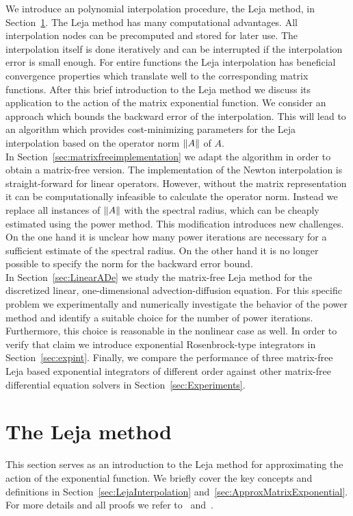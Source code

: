 \documentclass{scrartcl}
\begin{document}
	We introduce an polynomial interpolation procedure, the Leja method, in Section~\ref{sec:LejaMethod}. The Leja method has many computational advantages. All interpolation nodes can be precomputed and stored for later use. The interpolation itself is done iteratively and can be interrupted if the interpolation error is small enough. For entire functions the Leja interpolation has beneficial convergence properties which translate well to the corresponding matrix functions. After this brief introduction to the Leja method we discuss its application to the action of the matrix exponential function. We consider an approach which bounds the backward error of the interpolation. This will lead to an algorithm which provides cost-minimizing parameters for the Leja interpolation based on the operator norm $\lVert A\rVert$ of $A$. \\
	In Section~\ref{sec:matrixfreeimplementation} we adapt the algorithm in order to obtain a matrix-free version. The implementation of the Newton interpolation is straight-forward for linear operators. However, without the matrix representation it can be computationally infeasible to calculate the operator norm. Instead we replace all instances of $\lVert A\rVert$ with the spectral radius, which can be cheaply estimated using the power method. This modification introduces new challenges. On the one hand it is unclear how many power iterations are necessary for a sufficient estimate of the spectral radius. On the other hand it is no longer possible to specify the norm for the backward error bound. \\
	In Section~\ref{sec:LinearADe} we study the matrix-free Leja method for the discretized linear, one-dimensional advection-diffusion equation. For this specific problem we experimentally and numerically investigate the behavior of the power method and identify a suitable choice for the number of power iterations. Furthermore, this choice is reasonable in the nonlinear case as well. In order to verify that claim we introduce exponential Rosenbrock-type integrators in Section~\ref{sec:expint}. Finally, we compare the performance of three matrix-free Leja based exponential integrators of different order against other matrix-free differential equation solvers in Section~\ref{sec:Experiments}.
	

\section{The Leja method} \label{sec:LejaMethod}
	This section serves as an introduction to the Leja method for approximating the action of the exponential function. We briefly cover the key concepts and definitions in Section~\ref{sec:LejaInterpolation} and~\ref{sec:ApproxMatrixExponential}. For more details and all proofs we refer to~\cite{advdif} and~\cite{lejarev}. 
	
\end{document}
